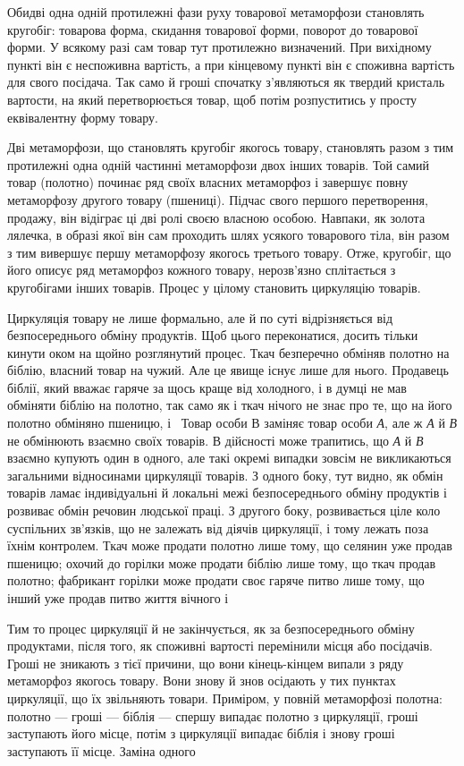 
Обидві одна одній протилежні фази руху товарової метаморфози
становлять кругобіг: товарова форма, скидання товарової
форми, поворот до товарової форми. У всякому разі сам товар
тут протилежно визначений. При вихідному пункті він є неспоживна
вартість, а при кінцевому пункті він є споживна вартість
для свого посідача. Так само й гроші спочатку з’являються як
твердий кристаль вартости, на який перетворюється товар, щоб
потім розпуститись у просту еквівалентну форму товару.

Дві метаморфози, що становлять кругобіг якогось товару,
становлять разом з тим протилежні одна одній частинні метаморфози
двох інших товарів. Той самий товар (полотно) починає ряд
своїх власних метаморфоз і завершує повну метаморфозу другого
товару (пшениці). Підчас свого першого перетворення, продажу,
він відіграє ці дві ролі своєю власною особою. Навпаки, як золота
лялечка, в образі якої він сам проходить шлях усякого товарового
тіла, він разом з тим вивершує першу метаморфозу якогось третього
товару. Отже, кругобіг, що його описує ряд метаморфоз
кожного товару, нерозв’язно сплітається з кругобігами інших
товарів. Процес у цілому становить циркуляцію товарів.

Циркуляція товару не лише формально, але й по суті відрізняється
від безпосереднього обміну продуктів. Щоб цього переконатися,
досить тільки кинути оком на щойно розглянутий процес.
Ткач безперечно обміняв полотно на біблію, власний товар на
чужий. Але це явище існує лише для нього. Продавець біблії,
який вважає гаряче за щось краще від холодного, і в думці не
мав обміняти біблію на полотно, так само як і ткач нічого не
знає про те, що на його полотно обміняно пшеницю, і~ Товар
особи В заміняє товар особи \emph{А}, але ж \emph{А} й \emph{В} не обмінюють взаємно
своїх товарів. В дійсності може трапитись, що \emph{А} й \emph{В} взаємно
купують один в одного, але такі окремі випадки зовсім не викликаються
загальними відносинами циркуляції товарів. З одного
боку, тут видно, як обмін товарів ламає індивідуальні й локальні
межі безпосереднього обміну продуктів і розвиває обмін
речовин людської праці. З другого боку, розвивається ціле коло
суспільних зв’язків, що не залежать від діячів циркуляції,
і тому лежать поза їхнім контролем. Ткач може продати полотно
лише тому, що селянин уже продав пшеницю; охочий до горілки
може продати біблію лише тому, що ткач продав полотно; фабрикант
горілки може продати своє гаряче питво лише тому, що інший
уже продав питво життя вічного і~

Тим то процес циркуляції й не закінчується, як за безпосереднього
обміну продуктами, після того, як споживні вартості
перемінили місця або посідачів. Гроші не зникають з тієї причини,
що вони кінець-кінцем випали з ряду метаморфоз якогось
товару. Вони знову й знов осідають у тих пунктах циркуляції,
що їх звільняють товари. Приміром, у повній метаморфозі полотна:
полотно — гроші — біблія — спершу випадає полотно з
циркуляції, гроші заступають його місце, потім з циркуляції
випадає біблія і знову гроші заступають її місце. Заміна одного
\parbreak{}  %
